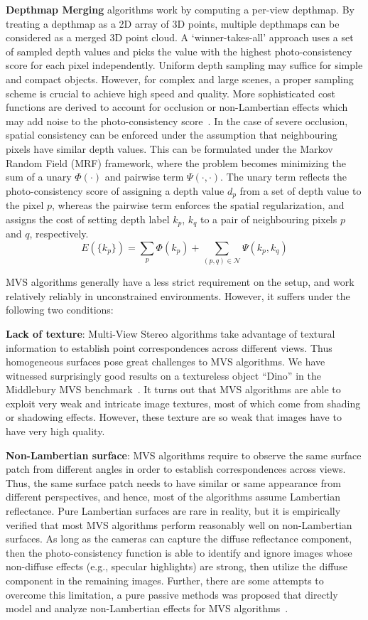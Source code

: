 \textbf{Depthmap Merging} algorithms work by computing a per-view depthmap. By treating a depthmap as a 2D array of 3D points, multiple depthmaps can be considered as a merged 3D point cloud. A `winner-takes-all' approach uses a set of sampled depth values and picks the value with the highest photo-consistency score for each pixel independently. Uniform depth sampling may suffice for simple and compact objects. However, for complex and large scenes, a proper sampling scheme is crucial to achieve high speed and quality. More sophisticated cost functions are derived to account for occlusion or non-Lambertian effects which may add noise to the photo-consistency score~\cite{goesele2006multi,vogiatzis2007multiview}. In the case of severe occlusion, spatial consistency can be enforced under the assumption that neighbouring pixels have similar depth values. This can be formulated under the Markov Random Field (MRF) framework, where the problem becomes minimizing the sum of a unary $\Phi(\cdot)$ and pairwise term $\Psi(\cdot, \cdot)$. The unary term reflects the photo-consistency score of assigning a depth value $d_p$ from a set of depth value to the pixel $p$, whereas the pairwise term enforces the spatial regularization, and assigns the cost of setting depth label $k_p$, $k_q$ to a pair of neighbouring pixels $p$ and $q$, respectively.
$$
E(\{k_p\})= \sum_p \Phi(k_p) + \sum_{(p,q)\in\mathcal{N}}\Psi(k_p, k_q)
$$

MVS algorithms generally have a less strict requirement on the setup, and work relatively reliably in unconstrained environments. However, it suffers under the following two conditions:

\textbf{Lack of texture}: Multi-View Stereo algorithms take advantage of textural information to establish point correspondences across different views. Thus homogeneous surfaces pose great challenges to MVS algorithms. We have witnessed surprisingly good results on a textureless object ``Dino'' in the Middlebury MVS benchmark~\cite{seitz2006comparison}. It turns out that MVS algorithms are able to exploit very weak and intricate image textures, most of which come from shading or shadowing effects. However, these texture are so weak that images have to have very high quality.

\textbf{Non-Lambertian surface}: MVS algorithms require to observe the same surface patch from different angles in order to establish correspondences across views. Thus, the same surface patch needs to have similar or same appearance from different perspectives, and hence, most of the algorithms assume Lambertian reflectance. Pure Lambertian surfaces are rare in reality, but it is empirically verified that most MVS algorithms perform reasonably well on non-Lambertian surfaces. As long as the cameras can capture the diffuse reflectance component, then the photo-consistency function is able to identify and ignore images whose non-diffuse effects (e.g., specular highlights) are strong, then utilize the diffuse component in the remaining images. Further, there are some attempts to overcome this limitation, a pure passive methods was proposed that directly model and analyze non-Lambertian effects for MVS algorithms~\cite{jin2003multi,jin2005multi}.


